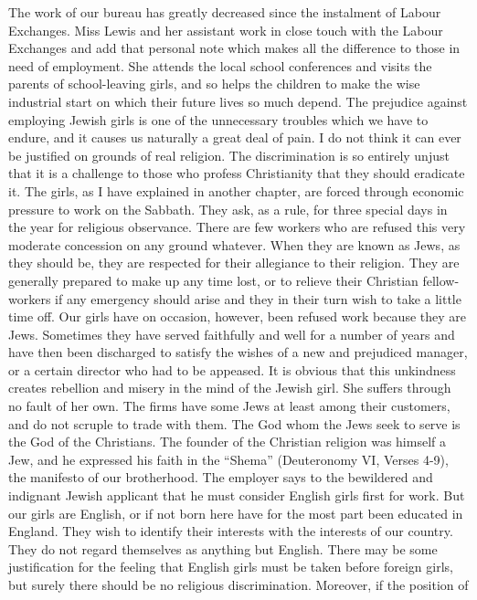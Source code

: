 The work of our bureau has greatly decreased since the
instalment of Labour Exchanges. Miss Lewis and her
assistant work in close touch with the Labour Exchanges
and add that personal note which makes all the difference
to those in need of employment. She attends the local
school conferences and visits the parents of school-leaving
girls, and so helps the children to make the wise industrial
start on which their future lives so much depend. The
prejudice against employing Jewish girls is one of the
unnecessary troubles which we have to endure, and it
causes us naturally a great deal of pain. I do not think it
can ever be justified on grounds of real religion. The
discrimination is so entirely unjust that it is a challenge
to those who profess Christianity that they should eradicate
it. The girls, as I have explained in another chapter,
are forced through economic pressure to work on the
Sabbath. They ask, as a rule, for three special days in
the year for religious observance. There are few workers
who are refused this very moderate concession on any
ground whatever. When they are known as Jews, as they
should be, they are respected for their allegiance to their
religion. They are generally prepared to make up any
time lost, or to relieve their Christian fellow-workers if
any emergency should arise and they in their turn wish
to take a little time off. Our girls have on occasion,
however, been refused work because they are Jews. Sometimes
they have served faithfully and well for a number of years
and have then been discharged to satisfy the wishes of a
new and prejudiced manager, or a certain director who
had to be appeased. It is obvious that this unkindness
creates rebellion and misery in the mind of the Jewish girl.
She suffers through no fault of her own. The firms have
some Jews at least among their customers, and do not
scruple to trade with them. The God whom the Jews seek
to serve is the God of the Christians. The founder of the
Christian religion was himself a Jew, and he expressed
his faith in the “Shema” (Deuteronomy VI, Verses 4-9),
the manifesto of our brotherhood. The employer says to
the bewildered and indignant Jewish applicant that he
must consider English girls first for work. But our girls
are English, or if not born here have for the most part
been educated in England. They wish to identify their
interests with the interests of our country. They do not
regard themselves as anything but English. There may
be some justification for the feeling that English girls must
be taken before foreign girls, but surely there should be
no religious discrimination. Moreover, if the position of
